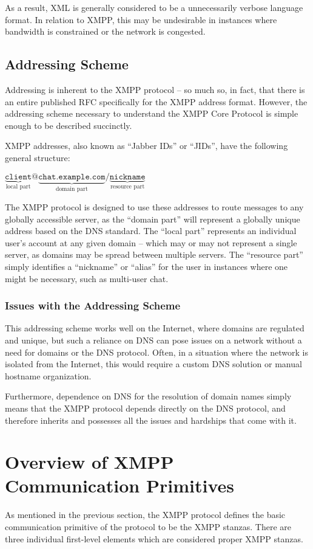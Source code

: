 \documentclass{article}
\begin{document}
As a result, XML is generally considered to be a unnecessarily verbose language
format. In relation to XMPP, this may be undesirable in instances where
bandwidth is constrained or the network is congested.

\subsection{Addressing Scheme}
Addressing is inherent to the XMPP protocol -- so much so, in fact, that there
is an entire published RFC specifically for the XMPP address format. However,
the addressing scheme necessary to understand the XMPP Core Protocol is simple
enough to be described succinctly. 

XMPP addresses, also known as ``Jabber IDs'' or ``JIDs'', have the following
general structure:
\begin{center}
$\underbrace{\texttt{client}}_\text{local
part}\texttt{@}\underbrace{\texttt{chat.example.com}}_\text{domain
part}\texttt{/}\underbrace{\texttt{nickname}}_\text{resource part}$
\end{center}

The XMPP protocol is designed to use these addresses to route messages to any
globally accessible server, as the ``domain part'' will represent a globally
unique address based on the DNS standard. The ``local part'' represents an
individual user's account at any given domain -- which may or may not represent
a single server, as domains may be spread between multiple servers. The
``resource part'' simply identifies a ``nickname'' or ``alias'' for the user in
instances where one might be necessary, such as multi-user chat.

\subsubsection{Issues with the Addressing Scheme}
This addressing scheme works well on the Internet, where domains are regulated
and unique, but such a reliance on DNS can pose issues on a network without a
need for domains or the DNS protocol. Often, in a situation where the network is
isolated from the Internet, this would require a custom DNS solution or manual
hostname organization.

Furthermore, dependence on DNS for the resolution of domain names simply means
that the XMPP protocol depends directly on the DNS protocol, and therefore
inherits and possesses all the issues and hardships that come with it.

\section{Overview of XMPP Communication Primitives}
As mentioned in the previous section, the XMPP protocol defines the basic
communication primitive of the protocol to be the XMPP stanzas. There are three
individual first-level elements which are considered proper XMPP stanzas.
\end{document}
